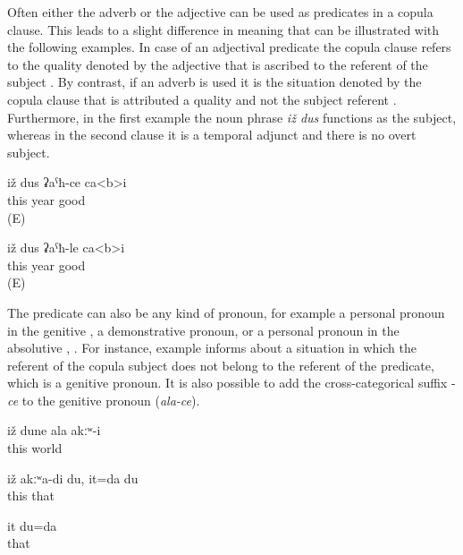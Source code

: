 Often either the adverb or the adjective can be used as predicates in a copula clause. This leads to a slight difference in meaning that can be illustrated with the following examples. In case of an adjectival predicate the copula clause refers to the quality denoted by the adjective that is ascribed to the referent of the subject . By contrast, if an adverb is used it is the situation denoted by the copula clause that is attributed a quality and not the subject referent . Furthermore, in the first example the noun phrase \textit{iž dus} functions as the subject, whereas in the second clause it is a temporal adjunct and there is no overt subject.
%
\begin{exe}

	\ex	\label{ex:This year is good}
	\gll	iž	dus	ʡaˁħ-ce	ca<b>i\\
		this	year	good	\\
	\glt	{} (E)
	
	
	\ex	\label{ex:In / during this year it is good}
	\gll	iž	dus	ʡaˁħ-le	ca<b>i\\
		this	year	good	\\
	\glt	{} (E)

\end{exe}

The predicate can also be any kind of pronoun, for example a personal pronoun in the genitive , a demonstrative pronoun, or a personal pronoun in the absolutive , . For instance, example  informs about a situation in which the referent of the copula subject does not belong to the referent of the predicate, which is a genitive pronoun. It is also possible to add the cross-categorical suffix -\textit{ce} to the genitive pronoun (\textit{ala-ce}).
%
\begin{exe}
	\ex	\label{ex:‎‎This world was not yours}
	\gll	iž	dune	ala	akːʷ-i\\
		this	world		\\
	\glt	{}
	
	\ex	\label{ex:‎‎‎This is not me, that is me}
	\gll	iž	akːʷa-di	du,	it=da	du\\
		this			that	\\
	\glt	{}

	\ex	\label{ex:That is me}
	\gll	it	du=da\\
		that	\\
	\glt	{}
\end{exe}

